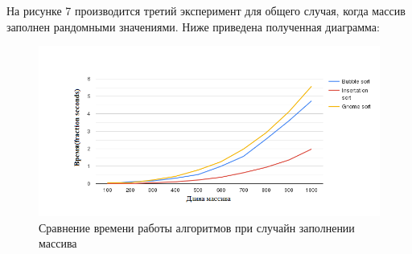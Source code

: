 \documentclass[a4paper, 12pt]{article}
\begin{document}
\begin{flushleft}
	\clearpage
	\newpage
	\hspace*{5mm} На рисунке 7 производится третий эксперимент для общего случая, когда массив заполнен рандомными значениями. Ниже приведена полученная диаграмма: 
	\begin{figure}[h]
		\includegraphics[scale=2]{random}
		\centering\caption{Сравнение времени работы алгоритмов при случайн заполнении массива}
	\end{figure}



\end{flushleft}
\end{document}
